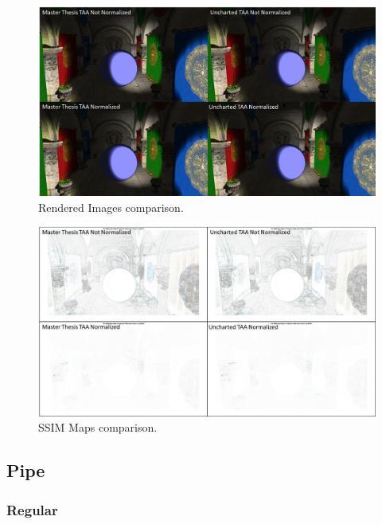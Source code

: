 \documentclass{cslthse-msc}
\begin{document}
\begin{figure}[H]
	\centering
	\includegraphics[scale=0.7]{images/results/sharpen_test_render.png}
	\caption{Rendered Images comparison.}\label{fig:sharpen_render}
\end{figure}

\begin{figure}[H]
	\centering
	\includegraphics[scale=0.7]{images/results/sharpen_test_ssim.png}
	\caption{SSIM Maps comparison.}\label{fig:sharpen_ssim}
\end{figure}


\subsection{Pipe}
\subsubsection{Regular}
\end{document}

